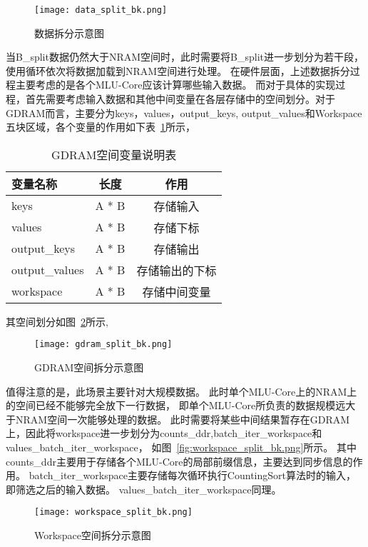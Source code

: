 \begin{figure}[ht]
    \centering
    \texttt{[image: data\_split\_bk.png]}
    \caption{数据拆分示意图}
    \label{fig:data_split_bk}
\end{figure}
当B\_split数据仍然大于NRAM空间时，此时需要将B\_split进一步划分为若干段，
使用循环依次将数据加载到NRAM空间进行处理。
在硬件层面，上述数据拆分过程主要考虑的是各个MLU-Core应该计算哪些输入数据。
而对于具体的实现过程，首先需要考虑输入数据和其他中间变量在各层存储中的空间划分。对于GDRAM而言，主要分为keys，values，output\_keys,
output\_values和Workspace五块区域，各个变量的作用如下表~\ref{tab:gdram_var_bk}所示，
\begin{table}
    \caption{GDRAM空间变量说明表}
    \centering
    \begin{tabular}{lcc}
    \toprule
    变量名称 & 长度 & 作用 \\
    \midrule
    keys & A * B & 存储输入 \\
    values & A * B & 存储下标 \\
    output\_keys & A * B & 存储输出 \\
    output\_values & A * B & 存储输出的下标 \\
    workspace & A * B & 存储中间变量 \\
    \bottomrule
    \end{tabular}
    \label{tab:gdram_var_bk}
\end{table}
其空间划分如图~\ref{fig:data_split_bk}所示,
\begin{figure}[ht]
    \centering
    \texttt{[image: gdram\_split\_bk.png]}
    \caption{GDRAM空间拆分示意图}
    \label{fig:data_split_bk}
\end{figure}
值得注意的是，此场景主要针对大规模数据。
此时单个MLU-Core上的NRAM上的空间已经不能够完全放下一行数据，
即单个MLU-Core所负责的数据规模远大于NRAM空间一次能够处理的数据。
此时需要将某些中间结果暂存在GDRAM上，因此将workspace进一步划分为counts\_ddr,batch\_iter\_workspace和values\_batch\_iter\_workspace，
如图~\ref{fig:workspace_split_bk.png}所示。
其中counts\_ddr主要用于存储各个MLU-Core的局部前缀信息，主要达到同步信息的作用。
batch\_iter\_workspace主要存储每次循环执行CountingSort算法时的输入，即筛选之后的输入数据。
values\_batch\_iter\_workspace同理。
\begin{figure}[ht]
    \centering
    \texttt{[image: workspace\_split\_bk.png]}
    \caption{Workspace空间拆分示意图}
    \label{fig:workspace_split_bk}
\end{figure}


